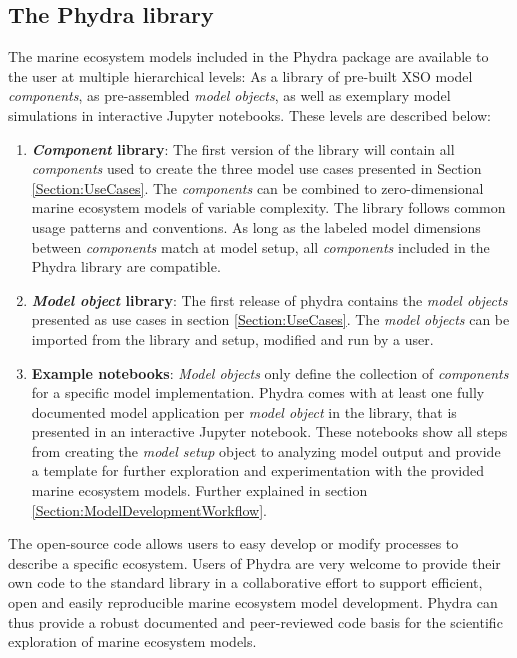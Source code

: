 \documentclass[journal abbreviation, manuscript]{copernicus}
\begin{document}
\subsection{The Phydra library} \label{Section:PhydraLibrary}

The marine ecosystem models included in the Phydra package are available to the user at multiple hierarchical levels: As a library of pre-built XSO model \textit{components}, as pre-assembled \textit{model objects}, as well as exemplary model simulations in interactive Jupyter notebooks. These levels are described below:

\begin{enumerate}
    \item \textbf{\textit{Component} library}: The first version of the library will contain all \textit{components} used to create the three model use cases presented in Section \ref{Section:UseCases}. The \textit{components} can be combined to zero-dimensional marine ecosystem models of variable complexity. The library follows common usage patterns and conventions. As long as the labeled model dimensions between \textit{components} match at model setup, all \textit{components} included in the Phydra library are compatible.
    
    \item \textbf{\textit{Model object} library}: The first release of phydra contains the \textit{model objects} presented as use cases in section \ref{Section:UseCases}. The \textit{model objects} can be imported from the library and setup, modified and run by a user.
    
    \item \textbf{Example notebooks}: \textit{Model objects} only define the collection of \textit{components} for a specific model implementation. Phydra comes with at least one fully documented model application per \textit{model object} in the library, that is presented in an interactive Jupyter notebook. These notebooks show all steps from creating the \textit{model setup} object to analyzing model output and provide a template for further exploration and experimentation with the provided marine ecosystem models. Further explained in section \ref{Section:ModelDevelopmentWorkflow}.
    
\end{enumerate}

The open-source code allows users to easy develop or modify processes to describe a specific ecosystem. Users of Phydra are very welcome to provide their own code to the standard library in a collaborative effort to support efficient, open and easily reproducible marine ecosystem model development. Phydra can thus provide a robust documented and peer-reviewed code basis for the scientific exploration of marine ecosystem models.
\end{document}
